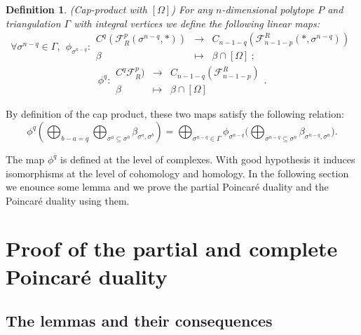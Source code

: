 \documentclass{article}
\newtheorem{definition}{Definition}
\begin{document}
\begin{definition}
    (Cap-product with $[\Omega]$) For any $n$-dimensional polytope $P$ and triangulation $\Gamma$ with integral vertices we define the following linear maps:
    \begin{equation*}
        \forall \sigma^{n-q}\in \Gamma,~~ \phi_{\sigma^{n-q}}: \begin{array}{rcl}
             C^{q}(\mathcal{F}^{p}_R(\sigma^{n-q},*)) & \rightarrow & C_{n-1-q}(\mathcal{F}_{n-1-p}^R(*,\sigma^{n-q}))  \\
             \beta & \mapsto & \beta \cap [\Omega] ~;
        \end{array}
    \end{equation*}
    \begin{equation*}
        \phi^q: \begin{array}{rcl}
             C^{q}\mathcal{F}^{p}_R) & \rightarrow & C_{n-1-q}(\mathcal{F}_{n-1-p}^R)  \\
             \beta & \mapsto & \beta \cap [\Omega] 
        \end{array}.
    \end{equation*}
    \label{defphi}
\end{definition}

By definition of the cap product, these two maps satisfy the following relation:
    \begin{equation*}
        \phi^q  \left ( \bigoplus_{b-a=q}\bigoplus_{\sigma^a\subseteq\sigma^b} \beta_{\sigma^a,\sigma^b} \right ) = \bigoplus_{\sigma^{n-q}\in\Gamma} \phi_{\sigma^{n-q}}\Bigg(\bigoplus_{\sigma^{n-q}\subseteq\sigma^n}\beta_{\sigma^{n-q},\sigma^n}\Bigg).
    \end{equation*}

The map $\phi^q$ is defined at the level of complexes. With good hypothesis it induces isomorphisms at the level of cohomology and homology. In the following section we enounce some lemma and we prove the partial Poincaré duality and the Poincaré duality using them.

\section{Proof of the partial and complete Poincaré duality}

\subsection{The lemmas and their consequences}
\end{document}
